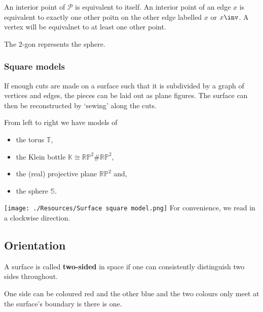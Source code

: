 \documentclass[12pt, a4paper]{article}
\begin{document}
\begin{example}
    An interior point of \(\mathcal{P}\) is equivalent to itself. An interior point of an edge \(x\) is equivalent to exactly one other poitn on the other edge labelled \(x\) or \(x\inv\). A vertex will be equivalnet to at least one other point.
\end{example}

\begin{mdexample}
    The \(2\)-gon represents the sphere.
\end{mdexample}

\subsubsection{Square models}

If enough cuts are made on a surface such that it is subdivided by a graph of vertices and edges, the pieces can be laid out as plane figures. The surface can then be reconstructed by `sewing' along the cuts.

\begin{mdexample}
    From left to right we have models of \begin{itemize}
        \item the torus \(\mathbb{T}\), 
        \item the Klein bottle \(\mathbb{K} \cong \mathbb{RP}^2 \#\mathbb{RP}^2\),
        \item the (real) projective plane \(\mathbb{RP}^2\) and,
        \item the sphere \(\mathbb{S}\).
    \end{itemize}
    \texttt{[image: ./Resources/Surface square model.png]}
    For convenience, we read in a clockwise direction.
\end{mdexample}

\subsection{Orientation}

\begin{definition}
    A surface is called \textbf{two-sided} in space if one can consistently distinguish two sides throughout.
\end{definition}

\begin{example}
    One side can be coloured red and the other blue and the two colours only meet at the surface's boundary is there is one.
\end{example}
\end{document}
